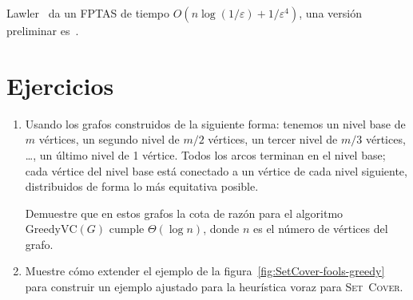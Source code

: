   Lawler~%
    \cite{lawler79:_fast_approx_algor_knaps_probl}
  da un FPTAS de tiempo \(O(n \log (1/\varepsilon) + 1/\varepsilon^4)\),
  una versión preliminar es~\cite{lawler77:_fast_approx_algor_knaps_probl}.

\section*{Ejercicios}
\label{sec:ejercicios-approximados}

  \begin{enumerate}
  \item
    Usando los grafos construidos de la siguiente forma:
    tenemos un nivel base de \(m\) vértices,
    un segundo nivel de \(m/2\) vértices,
    un tercer nivel de \(m/3\) vértices,
    \ldots,
    un último nivel de \num{1} vértice.
    Todos los arcos terminan en el nivel base;
    cada vértice del nivel base está conectado
    a un vértice de cada nivel siguiente,
    distribuidos de forma lo más equitativa posible.

    Demuestre que en estos grafos la cota de razón
    para el algoritmo \(\mathrm{GreedyVC}(G)\)
    cumple \(\Theta(\log n)\),
    donde \(n\) es el número de vértices del grafo.
  \item
    Muestre cómo extender el ejemplo
    de la figura~\ref{fig:SetCover-fools-greedy}
    para construir un ejemplo ajustado para la heurística voraz
    para \textsc{Set~Cover}.
  \end{enumerate}




